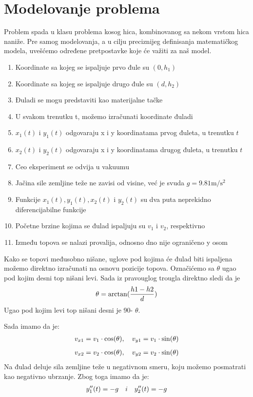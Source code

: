 \documentclass{article}
\begin{document}
\newpage
\section{\huge Modelovanje problema}\label{sec:modelovanje}
Problem spada u klasu problema kosog hica, kombinovanog sa nekom vrstom hica naniže.
Pre samog modelovanja, a u cilju preciznijeg definisanja matematičkog modela, uvešćemo određene pretpostavke koje će važiti za naš model.
\newline
\begin{enumerate}
  \item Koordinate sa kojeg se ispaljuje prvo đule su $(0, h_1)$
  \item Koordinate sa kojeg se ispaljuje drugo đule su $(d, h_2)$
  \item Đuladi se mogu predstaviti kao materijalne tačke
  \item U svakom trenutku t, možemo izračunati koordinate đuladi
  \item $x_1(t)$ i $y_1(t)$ odgovaraju x i y koordinatama prvog đuleta, u trenutku $t$
  \item $x_2(t)$ i $y_2(t)$ odgovaraju x i y koordinatama drugog đuleta, u trenutku $t$
  \item Ceo eksperiment se odvija u vakuumu
  \item Jačina sile zemljine teže ne zavisi od visine, već je svuda $g = 9.81 \mathrm{m/s^2}$
  \item Funkcije $x_1(t), y_1(t), x_2(t)$ i $y_2(t)$ su dva puta neprekidno diferencijabilne funkcije
  \item Početne brzine kojima se đulad ispaljuju su $v_1$ i $v_2$, respektivno
  \item Između topova se nalazi provalija, odnosno dno nije ograničeno y osom
  \newline
\end{enumerate}
Kako se topovi međusobno nišane, uglove pod kojima će đulad biti ispaljena možemo direktno izračunati na osnovu pozicije topova. Označićemo sa $\theta$ ugao pod kojim desni top nišani levi.
\newline
Sada iz pravouglog trougla direktno sledi da je 
\begin{align}
    \theta = \arctan( \frac{h1 - h2}{d}) \notag
\end{align}
Ugao pod kojim levi top nišani desni je 90\textdegree - $\theta$.
\newpage

Sada imamo da je: 
    \begin{align}
    v_{x1} = v_1\cdot\cos(\theta),  \quad v_{y1} = v_1 \cdot \sin(\theta) \notag  
    \end{align}
    \begin{align}
    v_{x2} = v_2 \cdot \cos(\theta), \quad v_{y2} = v_2 \cdot \sin(\theta) \notag
    \end{align}    
Na đulad deluje sila zemljine teže u negativnom smeru, koju možemo posmatrati kao negativno ubrzanje.
Zbog toga imamo da je:
\begin{align}
    y_1''(t) = -g \quad i \quad y_2''(t) = -g \notag 
\end{align}
\end{document}
